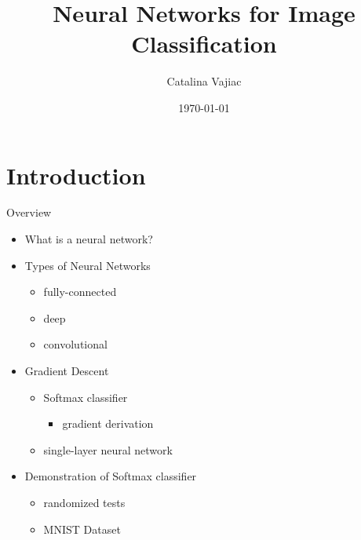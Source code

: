 \documentclass{beamer}
\title{Neural Networks for Image Classification}
\date{\today}
\author{Catalina Vajiac}
\institute{Saint Mary's College}
\begin{document}
  \maketitle

  \section{Introduction}
  \begin{frame}{Overview}
    \begin{itemize}
      \item What is a neural network?
      \item Types of Neural Networks
      \begin{itemize}
        \item fully-connected
        \item deep
        \item convolutional
      \end{itemize}
      \item Gradient Descent
      \begin{itemize}
        \item Softmax classifier
        \begin{itemize}
          \item gradient derivation
        \end{itemize}
        \item single-layer neural network
      \end{itemize}
      \item Demonstration of Softmax classifier
      \begin{itemize}
        \item randomized tests
        \item MNIST Dataset
      \end{itemize}
    \end{itemize}
  \end{frame}
\end{document}

